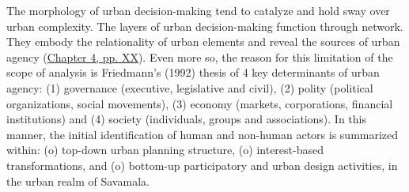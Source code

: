 \documentclass[11pt]{report}
\begin{document}
The morphology of urban decision-making tend to catalyze and hold sway over urban complexity.
The layers of urban decision-making function through network. They embody the relationality of urban elements and reveal the sources of urban agency (\href{ref}{Chapter 4, pp. XX}).
Even more so, the reason for this limitation of the scope of analysis is Friedmann's (1992) thesis of 4 key determinants of urban agency:
(1) governance (executive, legislative and civil),
(2) polity (political organizations, social movements),
(3) economy (markets, corporations, financial institutions) and
(4) society (individuals, groups and associations).
In this manner, the initial identification of human and non-human actors is summarized within:
(o) top-down urban planning structure,
(o) interest-based transformations,
and
(o) bottom-up participatory and urban design activities, in the urban realm of Savamala.
\end{document}
